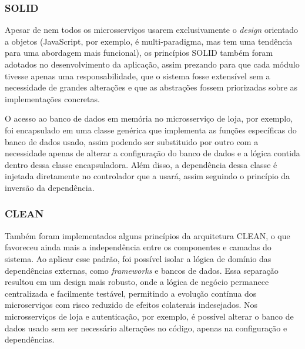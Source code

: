 \subsubsection*{SOLID}
Apesar de nem todos os microsserviços usarem exclusivamente o \emph{design} orientado a objetos (JavaScript, por exemplo, é multi-paradigma, mas tem uma tendência para uma abordagem mais funcional), os princípios SOLID também foram adotados no desenvolvimento da aplicação, assim prezando para que cada módulo tivesse apenas uma responsabilidade, que o sistema fosse extensível sem a necessidade de grandes alterações e que as abstrações fossem priorizadas sobre as implementações concretas.

O acesso ao banco de dados em memória no microsserviço de loja, por exemplo, foi encapsulado em uma classe genérica que implementa as funções específicas do banco de dados usado, assim podendo ser substituido por outro com a necessidade apenas de alterar a configuração do banco de dados e a lógica contida dentro dessa classe encapsuladora. Além disso, a dependência dessa classe é injetada diretamente no controlador que a usará, assim seguindo o princípio da inversão da dependência.


\subsubsection*{CLEAN}
Também foram implementados alguns princípios da arquitetura CLEAN, o que favoreceu ainda mais a independência entre os componentes e camadas do sistema. Ao aplicar esse padrão, foi possível isolar a lógica de domínio das dependências externas, como \emph{frameworks} e bancos de dados. Essa separação resultou em um design mais robusto, onde a lógica de negócio permanece centralizada e facilmente testável, permitindo a evolução contínua dos microserviços com risco reduzido de efeitos colaterais indesejados.
Nos microsserviços de loja e autenticação, por exemplo, é possível alterar o banco de dados usado sem ser necessário alterações no código, apenas na configuração e dependências.

